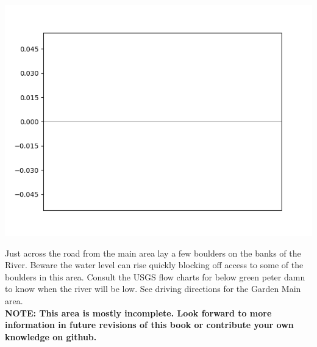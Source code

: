 

















\raggedcolumns
\begin{multicols}{2}



\includegraphics[width=0.9\linewidth]{./maps/plots//Pink Tag Boulders.png}
\end{multicols}
\begin{multicols}{2}
Just across the road from the main area lay a few boulders on the banks of the River. Beware the water level can rise quickly blocking off access to some of the boulders in this area. Consult the USGS flow charts for below green peter damn to know when the river will be low. See driving directions for the Garden Main area.\\

\textbf{NOTE: This area is mostly incomplete. Look forward to more information in future revisions of this book or contribute your own knowledge on github.}\\


\newpage






\end{multicols}
\clearpage